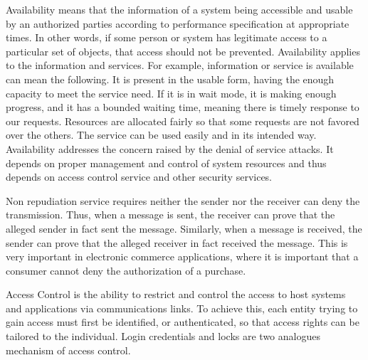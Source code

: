 	Availability  means that the information of a system being accessible and usable by an authorized parties according to performance specification at appropriate times.
	In other words, if some person or system has legitimate access to a particular set of objects, that access should not be prevented.
	Availability applies to the information and services.
	For example, information or service is available can mean the following. 
	It is present in the usable form, having the enough capacity to meet the service need.
	If it is in wait mode, it is making enough progress, and it has a bounded waiting time, meaning there is timely response to our requests.
	Resources are allocated fairly so that some requests are not favored over the others.
	The service can be used easily and in its intended way.
	Availability addresses the concern raised by the denial of service attacks.
	It depends on proper management and control of system resources and thus depends on access control service and other security services.
	
	Non repudiation service requires neither the sender nor the receiver can deny the transmission.
	Thus, when a message is sent, the receiver can prove that the alleged sender in fact sent the message.
	Similarly, when a message is received, the sender can prove that the alleged receiver in fact received the message.
	This is very important in electronic commerce applications, where it is important that a consumer cannot deny the authorization of a purchase.
	
	Access Control is the ability to restrict and control the access to host systems and applications via communications links.
	To achieve this, each entity trying to gain access must first be identified, or authenticated, so that access rights can be tailored to the individual.
	Login credentials and locks are two analogues mechanism of access control.

